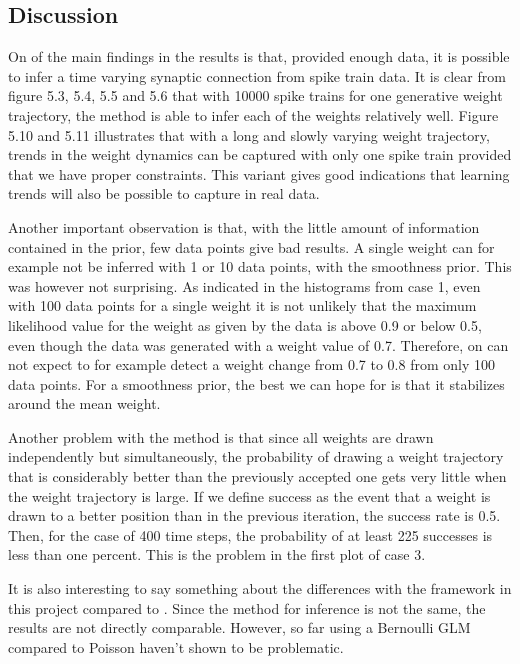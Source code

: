 \subsection{Discussion} 

On of the main findings in the results is that, provided enough data, it is possible to infer a time varying synaptic connection from spike train data. It is clear from figure 5.3, 5.4, 5.5 and 5.6 that with 10000 spike trains for one generative weight trajectory, the method is able to infer each of the weights relatively well. Figure 5.10 and 5.11 illustrates that with a long and slowly varying weight trajectory, trends in the weight dynamics can be captured with only one spike train provided that we have proper constraints. This variant gives good indications that learning trends will also be possible to capture in real data. 

Another important observation is that, with the little amount of information contained in the prior, few data points give bad results. A single weight can for example not be inferred with 1 or 10 data points, with the smoothness prior. This was however not surprising. As indicated in the histograms from case 1, even with 100 data points for a single weight it is not unlikely that the maximum likelihood value for the weight as given by the data is above 0.9 or below 0.5, even though the data was generated with a weight value of 0.7. Therefore, on can not expect to for example detect a weight change from 0.7 to 0.8 from only 100 data points. For a smoothness prior, the best we can hope for is that it stabilizes around the mean weight.

Another problem with the method is that since all weights are drawn independently but simultaneously, the probability of drawing a weight trajectory that is considerably better than the previously accepted one gets very little when the weight trajectory is large. If we define success as the event that a weight is drawn to a better position than in the previous iteration, the success rate is 0.5. Then, for the case of 400 time steps, the probability of at least 225 successes is less than one percent. This is the problem in the first plot of case 3.  

It is also interesting to say something about the differences with the framework in this project compared to \cite{Linderman}. Since the method for inference is not the same, the results are not directly comparable. However, so far using a Bernoulli GLM compared to Poisson haven't shown to be problematic. 


